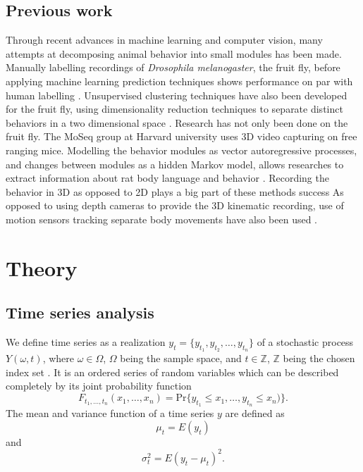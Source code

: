 \documentclass[a4paper, 10pt]{memoir}
\theoremstyle{plain}
\theoremstyle{definition}
\theoremstyle{remark}
\begin{document}
\section{Previous work}
Through recent advances in machine learning and computer vision, many attempts at decomposing animal behavior into small modules has been made.
Manually labelling recordings of \textit{Drosophila melanogaster}, the fruit fly, before applying machine learning prediction techniques shows performance on par with human labelling \cite{kain}.
Unsupervised clustering techniques have also been developed for the fruit fly, using dimensionality reduction techniques to separate distinct behaviors in a two dimensional space \cite{berman}.
Research has not only been done on the fruit fly.
The MoSeq group at Harvard university uses 3D video capturing on free ranging mice.
Modelling the behavior modules as vector autoregressive processes, and changes between modules as a hidden Markov model, allows researches to extract information about rat body language and behavior \cite{wiltschko}.
Recording the behavior in 3D as opposed to 2D plays a big part of these methods success \cite{marshall}
As opposed to using depth cameras to provide the 3D kinematic recording, use of motion sensors tracking separate body movements have also been used \cite{mimica}. 





\chapter{Theory}
\section{Time series analysis}
We define time series as a realization $y_t = \{ y_{t_1}, y_{t_2}, \hdots, y_{t_n} \}$ of a stochastic process $Y(\omega, t)$, where $\omega \in \Omega$, $\Omega$ being the sample space,  and $t \in \mathbb{Z}$, $\mathbb{Z}$ being the chosen index set  \cite{wei}.
It is an ordered series of random variables which can be described completely by its joint probability function
\begin{equation*}
        F_{t_1,\hdots, t_n}(x_1, \hdots, x_n) = \text{Pr}\{ y_{t_1} \leq x_{1}, \hdots, y_{t_n} \leq x_n) \}.
\end{equation*}
The mean and variance function of a time series $y$ are defined as
\begin{equation}\label{eq:mean_func}
        \mu_t = E(y_t)  
\end{equation}
and
\begin{equation*}
        \sigma_t^2 = E(y_t - \mu_t)^2.
\end{equation*}
\end{document}
